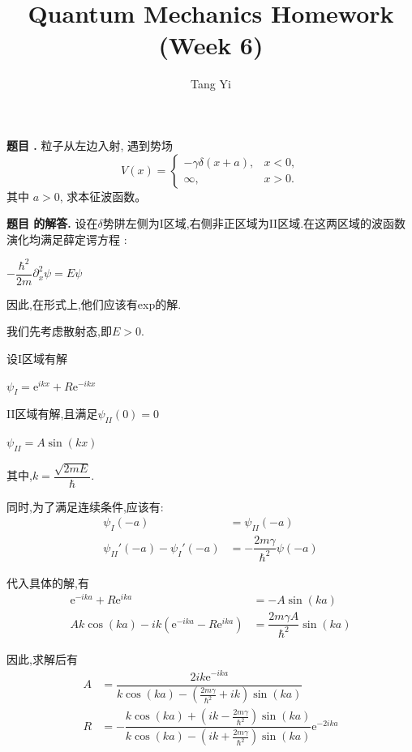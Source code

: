 \documentclass[12pt, a4paper, oneside]{ctexart}
\title{Quantum Mechanics Homework (Week 6)}
\author{Tang Yi \\ [学号已脱敏]}
\newcounter{problemname}
\newenvironment{problem}
  {\begin{shaded}\stepcounter{problemname}\par\noindent\textbf{题目 \theproblemname. }}
  {\end{shaded}\par}
\newenvironment{solution}
  {\par\noindent\textbf{题目 \theproblemname 的解答. }}
  {\par}
\begin{document}
\maketitle

\begin{problem}
  粒子从左边入射, 遇到势场
  \[
  V(x) = 
  \begin{cases}
  -\gamma\delta(x+a), & x<0,\\
  \infty, & x>0.
  \end{cases}
  \]
其中 $a>0$, 求本征波函数。
\end{problem}

\begin{solution}
  设在$\delta$势阱左侧为I区域,右侧非正区域为II区域.在这两区域的波函数演化均满足薛定谔方程 :

  \centerline{$-\dfrac{\hbar^2}{2m} \partial_x^2 \psi = E \psi$}

  因此,在形式上,他们应该有exp的解.

  我们先考虑散射态,即$E > 0$.

  设I区域有解

  \centerline{$\psi_{I} = \mathrm{e}^{ikx} + R\mathrm{e}^{-ikx}$}

  II区域有解,且满足$\psi_{II}(0) = 0$

  \centerline{$\psi_{II} = A \sin(kx)$}

  其中,$k = \dfrac{\sqrt{2mE}}{\hbar}$.

  同时,为了满足连续条件,应该有:
  \begin{align*}
    \psi_{I}(-a) &= \psi_{II}(-a)\\
    \psi_{II}'(-a) - \psi_{I}'(-a) &= -\dfrac{2m\gamma}{\hbar^2} \psi(-a)
  \end{align*}

  代入具体的解,有
  \begin{align*}
    \mathrm{e}^{-ika} + R \mathrm{e}^{ika} &= -A\sin(ka) \\
    Ak\cos(ka) - ik \left(\mathrm{e}^{-ika} - R \mathrm{e}^{ika}\right) &= \dfrac{2m\gamma A}{\hbar^2} \sin(ka)
  \end{align*}

  因此,求解后有
  \begin{align*}
    A &= \dfrac{2ik\mathrm{e}^{-ika}}{k\cos(ka) -(\frac{2m\gamma}{\hbar^2} + ik)\sin(ka)} \\
    R &= -\dfrac{k\cos(ka) +(ik - \frac{2m\gamma}{\hbar^2})\sin(ka)}{k\cos(ka) -(ik + \frac{2m\gamma}{\hbar^2})\sin(ka)} \mathrm{e}^{-2ika}
  \end{align*}


\end{solution}
\end{document}
